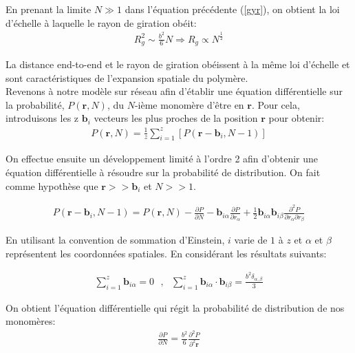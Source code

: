 \documentclass[a4paper,11pt]{article}
\begin{document}
En prenant la limite $N \gg 1$ dans l'équation précédente (\ref{gyr}), on obtient la loi d'échelle à laquelle le rayon de giration obéit:
\begin{eqnarray}
R_g^2\text{}\sim\text{}\frac{b^2}{6}N \Rightarrow R_g\propto N^{\frac12}
\end{eqnarray}

La distance end-to-end et le rayon de giration obéissent à la même loi d'échelle et sont caractéristiques de l'expansion spatiale du polymère.\\


Revenons à notre modèle sur réseau afin d'établir une équation différentielle sur la probabilité, $P(\textbf{r},N)$, du $N$-ième monomère d'être en $\textbf{r}$. Pour cela, introduisons les z $\textbf{b}_i$  vecteurs les plus proches de la position $\textbf{r}$ pour obtenir:
\begin{eqnarray}
P(\textbf{r},N)= \frac{1}{z}\sum_{i=1}^{z} \left[P(\textbf{r}-\textbf{b}_i,N-1)\right]
\label{eqdifprob}
\end{eqnarray}

On effectue ensuite un développement limité à l'ordre 2 afin d'obtenir une équation différentielle à résoudre sur la probabilité de distribution. On fait comme hypothèse que $\textbf{r}>>\textbf{b}_i$ et $N >> 1$.

\begin{eqnarray}
P(\textbf{r}-\textbf{b}_i,N-1)=P(\textbf{r},N)- \frac{\partial P}{\partial N}-  \textbf{b}_{i\alpha} \frac{\partial P}{\partial r_{\alpha} } + \frac12 \textbf{b}_{i\alpha}\textbf{b}_{i\beta} \frac{\partial ^2 P}{\partial r_{\alpha}\partial r_{\beta} }
\end{eqnarray}

En utilisant la convention de sommation d'Einstein, $i$ varie de $1$ à $z$ et $\alpha$ et $\beta$ représentent les coordonnées spatiales. En considérant les résultats suivants:

\begin{eqnarray}
\sum_{i=1}^{z}\textbf{b}_{i\alpha}=0 \text{ },\text{ } \sum_{i=1}^{z}\textbf{b}_{i\alpha}\cdot\textbf{b}_{i\beta} = \frac{b^2\delta_{\alpha,\beta}}{3}
\end{eqnarray}

On obtient l'équation différentielle qui régit la probabilité de distribution de nos monomères:
\begin{eqnarray}
 \frac{\partial P}{\partial N} =   \frac{b^2}{6}\frac{\partial ^2 P}{\partial ^2 \textbf{r}}
 \label{eqdif}
\end{eqnarray}
\end{document}
